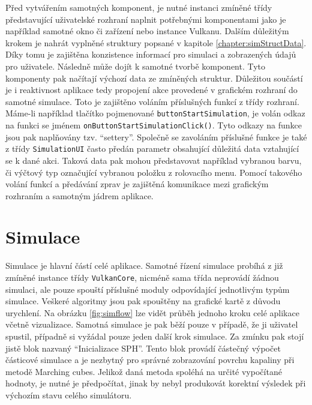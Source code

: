 Před vytvářením samotných komponent, je nutné instanci zmíněné třídy představující uživatelské rozhraní naplnit potřebnými komponentami jako je například samotné okno či zařízení nebo instance Vulkanu. Dalším důležitým krokem je nahrát vyplněné struktury popsané v kapitole \ref{chapter:simStructData}. Díky tomu je zajištěna konzistence informací pro simulaci a zobrazených údajů pro uživatele. Následně může dojít k samotné tvorbě komponent. Tyto komponenty pak načítají výchozí data ze zmíněných struktur. Důležitou součástí je i reaktivnost aplikace tedy propojení akce provedené v grafickém rozhraní do samotné simulace. Toto je zajištěno voláním příslušných funkcí z třídy rozhraní. Máme-li například tlačítko pojmenované \texttt{buttonStartSimulation}, je volán odkaz na funkci se jménem \texttt{onButtonStartSimulationClick()}. Tyto odkazy na funkce jsou pak naplňovány tzv. \enquote{settery}. Společně se zavoláním příslušné funkce je také z třídy \texttt{SimulationUI} často předán parametr obsahující důležitá data vztahující se k dané akci. Taková data pak mohou představovat například vybranou barvu, či výčtový typ označující vybranou položku z rolovacího menu. Pomocí takového volání funkcí a předávání zprav je zajištěná komunikace mezi grafickým rozhraním a samotným jádrem aplikace.

\section{Simulace}
\label{chapter:simulace}
Simulace je hlavní částí celé aplikace. Samotné řízení simulace probíhá z již zmíněné instance třídy \texttt{VulkanCore}, nicméně sama třída neprovádí žádnou simulaci, ale pouze spouští příslušné moduly odpovídající jednotlivým typům simulace. Veškeré algoritmy jsou pak spouštěny na grafické kartě z důvodu urychlení. Na obrázku \ref{fig:simflow} lze vidět průběh jednoho kroku celé aplikace včetně vizualizace. Samotná simulace je pak běží pouze v případě, že ji uživatel spustil, případně si vyžádal pouze jeden další krok simulace. Za zmínku pak stojí jistě blok nazvaný \enquote{Inicializace SPH}. Tento blok provádí částečný výpočet částicové simulace a je nezbytný pro správné zobrazování povrchu kapaliny při metodě Marching cubes. Jelikož daná metoda spoléhá na určité vypočítané hodnoty, je nutné je předpočítat, jinak by nebyl produkovát korektní výsledek při výchozím stavu celého simulátoru.

